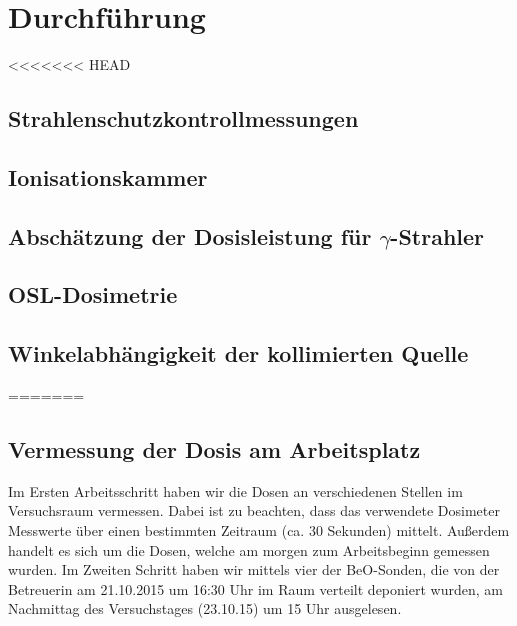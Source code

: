 \section{Durchführung}
<<<<<<< HEAD
\subsection{Strahlenschutzkontrollmessungen}

\subsection{Ionisationskammer}

\subsection{Abschätzung der Dosisleistung für $\gamma$-Strahler}

\subsection{OSL-Dosimetrie}

\subsection{Winkelabhängigkeit der kollimierten Quelle}
=======

\subsection{Vermessung der Dosis am Arbeitsplatz}
Im Ersten Arbeitsschritt haben wir die Dosen an verschiedenen Stellen im Versuchsraum vermessen. Dabei ist zu beachten, dass das verwendete Dosimeter Messwerte über einen bestimmten Zeitraum (ca. 30 Sekunden) mittelt. Außerdem handelt es sich um die Dosen, welche am morgen zum Arbeitsbeginn gemessen wurden. %
Im Zweiten Schritt haben wir mittels vier der BeO-Sonden, die von der Betreuerin am 21.10.2015 um 16:30 Uhr im Raum verteilt deponiert wurden, am Nachmittag des Versuchstages (23.10.15) um 15 Uhr ausgelesen.  %

